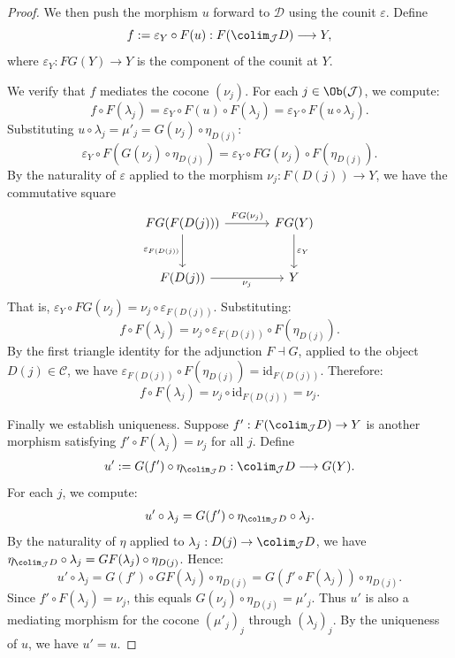 \begin{proof}
    We then push the morphism $u$ forward to $\mathcal{D}$ using the counit $\varepsilon$. Define
    $$
    f := \varepsilon_Y \circ F(u) : F(\colim_{\mathcal{J}} D) \longrightarrow Y,
    $$
    where $\varepsilon_Y : FG(Y) \to Y$ is the component of the counit at $Y$.

    We verify that $f$ mediates the cocone $(\nu_j)$. For each $j \in \Ob(\mathcal{J})$, we compute:
    $$
    f \circ F(\lambda_j) = \varepsilon_Y \circ F(u) \circ F(\lambda_j) = \varepsilon_Y \circ F(u \circ \lambda_j).
    $$
    Substituting $u \circ \lambda_j = \mu'_j = G(\nu_j) \circ \eta_{D(j)}$:
    $$
    \varepsilon_Y \circ F(G(\nu_j) \circ \eta_{D(j)}) = \varepsilon_Y \circ FG(\nu_j) \circ F(\eta_{D(j)}).
    $$
    By the naturality of $\varepsilon$ applied to the morphism $\nu_j : F(D(j)) \to Y$, we have the commutative square
    \[
    \begin{tikzcd}[row sep=large, column sep=large]
        FG(F(D(j))) \arrow[r, "FG(\nu_j)"] \arrow[d, "\varepsilon_{F(D(j))}"'] & FG(Y) \arrow[d, "\varepsilon_Y"] \\
        F(D(j)) \arrow[r, "\nu_j"'] & Y
    \end{tikzcd}
    \]
    That is, $\varepsilon_Y \circ FG(\nu_j) = \nu_j \circ \varepsilon_{F(D(j))}$. Substituting:
    $$
    f \circ F(\lambda_j) = \nu_j \circ \varepsilon_{F(D(j))} \circ F(\eta_{D(j)}).
    $$
    By the first triangle identity for the adjunction $F \dashv G$, applied to the object $D(j) \in \mathcal{C}$, we have $\varepsilon_{F(D(j))} \circ F(\eta_{D(j)}) = \mathrm{id}_{F(D(j))}$. Therefore:
    $$
    f \circ F(\lambda_j) = \nu_j \circ \mathrm{id}_{F(D(j))} = \nu_j.
    $$

    Finally we establish uniqueness. Suppose $f' : F(\colim_{\mathcal{J}} D) \to Y$ is another morphism satisfying $f' \circ F(\lambda_j) = \nu_j$ for all $j$. Define
    $$
    u' := G(f') \circ \eta_{\colim_{\mathcal{J}} D} : \colim_{\mathcal{J}} D \longrightarrow G(Y).
    $$
    For each $j$, we compute:
    $$
    u' \circ \lambda_j = G(f') \circ \eta_{\colim_{\mathcal{J}} D} \circ \lambda_j.
    $$
    By the naturality of $\eta$ applied to $\lambda_j : D(j) \to \colim_{\mathcal{J}} D$, we have $\eta_{\colim_{\mathcal{J}} D} \circ \lambda_j = GF(\lambda_j) \circ \eta_{D(j)}$. Hence:
    $$
    u' \circ \lambda_j = G(f') \circ GF(\lambda_j) \circ \eta_{D(j)} = G(f' \circ F(\lambda_j)) \circ \eta_{D(j)}.
    $$
    Since $f' \circ F(\lambda_j) = \nu_j$, this equals $G(\nu_j) \circ \eta_{D(j)} = \mu'_j$. Thus $u'$ is also a mediating morphism for the cocone $(\mu'_j)_j$ through $(\lambda_j)_j$. By the uniqueness of $u$, we have $u' = u$.


\end{proof}
